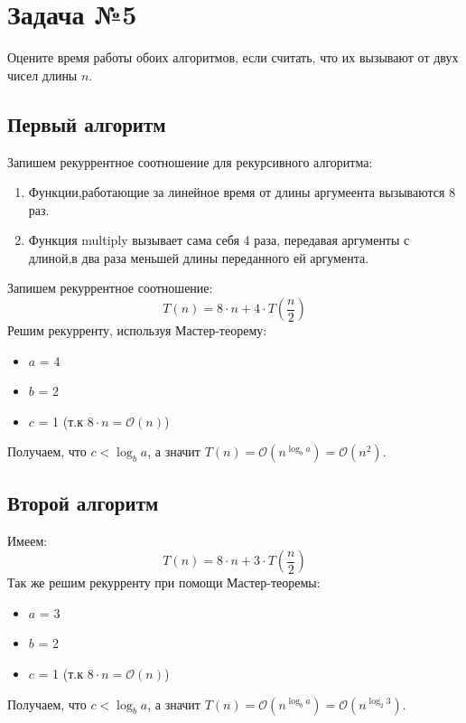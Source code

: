 \documentclass{article}
\begin{document}
\section*{Задача №5}
Оцените время работы обоих алгоритмов, если считать, что их вызывают от двух чисел длины $n$.
\subsection*{Первый алгоритм}
Запишем рекуррентное соотношение для рекурсивного алгоритма:\begin{enumerate}
\item Функции,работающие за линейное время от длины аргумеента вызываются 8 раз.
\item Функция multiply вызывает сама себя 4 раза, передавая аргументы с длиной,в два раза меньшей длины переданного ей аргумента.
\end{enumerate}
Запишем рекуррентное соотношение:
$$T(n) = 8 \cdot n + 4 \cdot T(\frac{n}{2})$$
Решим рекурренту, используя Мастер-теорему:
\begin{itemize}
\item $a$ = 4
\item $b$ = 2
\item $c$ = 1 \quad (т.к $8 \cdot n = \mathcal{O}(n)$)
\end{itemize}
Получаем, что
$c < \log_b{a} $, а значит $T(n) = \mathcal{O}(n^{\log_b{a}}) = \mathcal{O}(n^{2}).$
\\
\subsection*{Второй алгоритм}
Имеем:
$$T(n) = 8 \cdot n + 3 \cdot T(\frac{n}{2})$$
Так же решим рекурренту при помощи Мастер-теоремы:
\begin{itemize}
	\item $a$ = 3
	\item $b$ = 2
	\item $c$ = 1 \quad (т.к $8 \cdot n = \mathcal{O}(n)$)
\end{itemize}
Получаем, что
$c < \log_b{a} $, а значит $T(n) = \mathcal{O}(n^{\log_b{a}}) = \mathcal{O}(n^{\log_2{3}}).$
\end{document}
